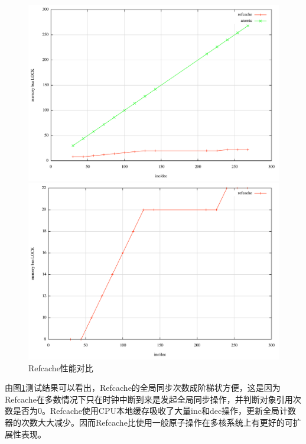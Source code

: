 \begin{figure}[ht]
\begin{minipage}{0.48\textwidth}
  \centering
  \includegraphics[width=\textwidth]{figures/refcache1.pdf}
\end{minipage}\hfill
\begin{minipage}{0.48\textwidth}
  \centering
  \includegraphics[width=\textwidth]{figures/refcache2.pdf}
\end{minipage}
\caption{Refcache性能对比}
\label{fig:rc-cmp}
\end{figure}

由图\ref{fig:rc-cmp}测试结果可以看出，Refcache的全局同步次数成阶梯状方便，这是因为Refcache在多数情况下只在时钟中断到来是发起全局同步操作，并判断对象引用次数是否为0。Refcache使用CPU本地缓存吸收了大量inc和dec操作，更新全局计数器的次数大大减少。因而Refcache比使用一般原子操作在多核系统上有更好的可扩展性表现。

